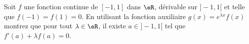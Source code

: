 
\begin{exercice}\label{exo0096}

Soit $f$ une fonction continue de $[-1,1]$ dans $\eR$, dérivable sur $]- 1,1[$ et telle que $f(-1)=f(1)=0$. En utilisant la fonction auxiliaire $g(x) = e^{\lambda x}f(x)$ montrez que pour tout $\lambda \in \eR$, il existe $a \in ]-1,1[$ tel que $f'(a) + \lambda f(a) = 0$.

\end{exercice}
